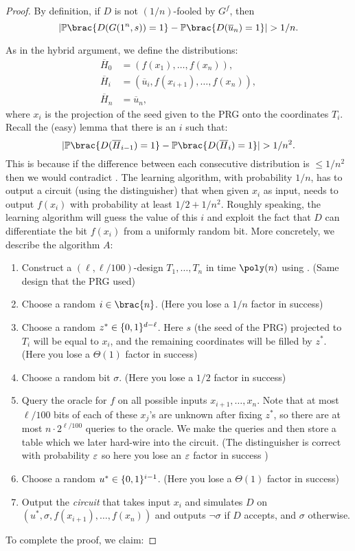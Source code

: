 \begin{proof}
	By definition, if $D$ is not $(1/n)$-fooled by $G^f$, then
	\begin{equation}\label{eq:dist-NW-prg}
		\card{\Pr\brac{D(G(1^n, s)) = 1} - \Pr\brac{D(\overline{u}_n) = 1}} > 1/n.
	\end{equation}
	
	As in the hybrid argument, we define the distributions:
	\begin{align*}
		\overline{H}_0 &= (f(x_1), \ldots, f(x_n)),\\
		\overline{H}_i &= (\overline{u}_i, f(x_{i + 1}), \ldots, f(x_n)),\\
		\overline{H}_n &= \overline{u}_n,
	\end{align*}
	where $x_i$ is the projection of the seed given to the PRG onto the
	coordinates $T_i$. Recall the (easy) lemma that there is an $i$ such that:
	\[
	\card{\Pr\brac{D(\overline{H}_{i - 1}) = 1} - \Pr\brac{D(\overline{H}_i) = 1}} > 1 / n^2.
	\]
	This is because if the difference between each consecutive distribution is $\leq 1/n^2$ then we would contradict .
	The learning algorithm, with probability $1/n$, has to output a circuit (using the distinguisher) that when given $x_i$ as input, needs to output $f(x_i)$ with probability at least $1/2 + 1/n^2$.
	Roughly speaking, the learning algorithm will guess the value of this $i$ and
	exploit the fact that $D$ can differentiate the bit $f(x_i)$ from a uniformly
	random bit. More concretely, we describe the algorithm $A$:
	\begin{enumerate}
		\item Construct a $(\ell, \ell/100)$-design $T_1, \dots, T_n$ in
		time $\poly(n)$ using . (Same design that the PRG used)
		\item Choose a random $i \in \brac{n}$. (Here you lose a $1/n$ factor in success)
		\item Choose a random $z^* \in \{0, 1\}^{d - \ell}$. Here $s$
		(the seed of the PRG) projected to $T_i$ will be equal to $x_i$,
		and the remaining coordinates will be filled by $z^*$. (Here you lose a $\Theta(1)$ factor in success)
		\item Choose a random bit $\sigma$. (Here you lose a $1/2$ factor in success)
		\item Query the oracle for $f$ on all possible inputs
		$x_{i + 1}, \ldots , x_n$. Note that at most $\ell / 100$ bits of
		each of these $x_j$'s are unknown after fixing $z^*$, so there
		are at most $n \cdot 2^{\ell / 100}$ queries to the oracle. We make the queries and then store a table which we later hard-wire into the circuit. (The distinguisher is correct with probability $\varepsilon$ so here you lose an $\varepsilon$ factor in success )
		\item Choose a random $u^* \in \{0, 1\}^{i - 1}$. (Here you lose a $\Theta(1)$ factor in success)
		\item Output the \emph{circuit} that takes input $x_i$ and simulates
		$D$ on $(u^*, \sigma, f(x_{i + 1}), \ldots , f(x_n))$ and outputs
		$\lnot \sigma$ if $D$ accepts, and $\sigma$ otherwise. 
	\end{enumerate}
	To complete the proof, we claim:
	

\end{proof}
